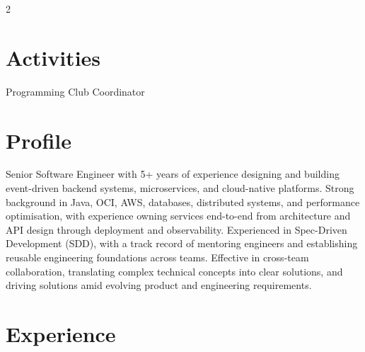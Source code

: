 \documentclass[]{hieudo-build}
\begin{document}
\begin{paracol}{2}
\sectionsep

\section{Activities}
Programming Club Coordinator\\
\sectionsep

\switchcolumn

%
%

\section{Profile}
Senior Software Engineer with 5+ years of experience designing and building event-driven backend systems, microservices, and cloud-native platforms. Strong background in Java, OCI, AWS, databases, distributed systems, and performance optimisation, with experience owning services end-to-end from architecture and API design through deployment and observability. Experienced in Spec-Driven Development (SDD), with a track record of mentoring engineers and establishing reusable engineering foundations across teams. Effective in cross-team collaboration, translating complex technical concepts into clear solutions, and driving solutions amid evolving product and engineering requirements.

\sectionsep

\section{Experience}

\\


\end{paracol}
\end{document}
